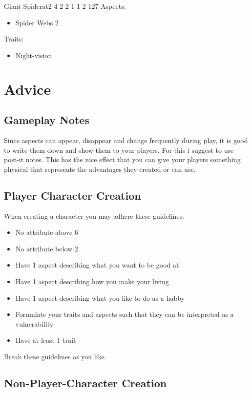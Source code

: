 \documentclass[11pt]{article}
\begin{document}
{\begin{npc}{Giant Spider}{at}{2 4 2 2 1 1 2 1}{27}
Aspects:
\begin{itemize}
\item Spider Webs 2
\end{itemize}
Traits:
\begin{itemize}
\item Night-vision
\end{itemize}
\end{npc}


\newpage

\section{Advice}
\label{sec:orgf41f4c6}
\subsection{Gameplay Notes}
\label{sec:org9e5cfec}

Since aspects can appear, disappear and change frequently during play, it is good to write them down and show them to your players. For this i suggest to use post-it notes. This has the nice effect that you can give your players something physical that represents the advantages they created or can use.

\subsection{Player Character Creation}
\label{sec:org4757629}

When creating a character you may adhere these guidelines:
\begin{itemize}
\item No attribute above 6
\item No attribute below 2
\item Have 1 aspect describing what you want to be good at
\item Have 1 aspect describing how you make your living
\item Have 1 aspect describing what you like to do as a hubby
\item Forumlate your traits and aspects such that they can be interpreted as a vulnerability
\item Have at least 1 trait
\end{itemize}
Break these guidelines as you like.

\subsection{Non-Player-Character Creation}
\label{sec:org2eb10e5}

}
\end{document}
